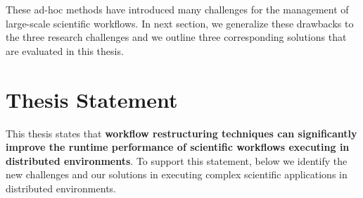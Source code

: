 These ad-hoc methods have introduced many challenges for the management of large-scale scientific workflows. In next section, we generalize these drawbacks to the three research challenges and we outline three corresponding solutions that are evaluated in this thesis. 

\section{Thesis Statement}
This thesis states that \textbf{workflow restructuring techniques can significantly improve the runtime performance of scientific workflows executing in distributed environments}. 
To support this statement, below we identify the new challenges and our solutions in executing complex scientific applications in distributed environments. 




